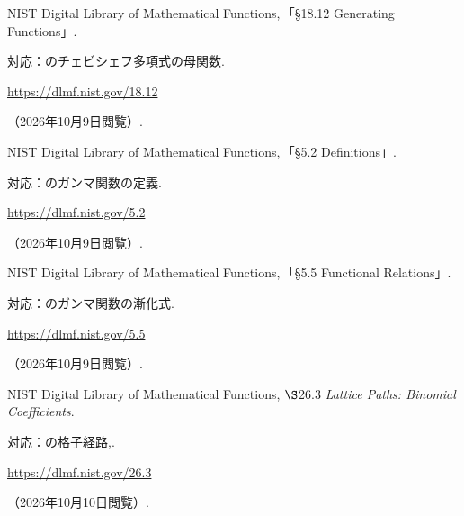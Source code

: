 \begin{enumerate}[resume,label={[\arabic*]}]
    \item \begin{minipage}[t]{\linewidth}\raggedright
        NIST Digital Library of Mathematical Functions,\,「§18.12 Generating Functions」.
        \par{\small 対応：のチェビシェフ多項式の母関数.\par}
        \par\noindent\url{https://dlmf.nist.gov/18.12}\par
        \noindent（2026年10月9日閲覧）.
      \end{minipage}\par\smallskip

    \item \begin{minipage}[t]{\linewidth}\raggedright
        NIST Digital Library of Mathematical Functions,\,「§5.2 Definitions」.
        \par{\small 対応：のガンマ関数の定義.\par}
        \par\noindent\url{https://dlmf.nist.gov/5.2}\par
        \noindent（2026年10月9日閲覧）.
      \end{minipage}\par\smallskip

    \item \begin{minipage}[t]{\linewidth}\raggedright
        NIST Digital Library of Mathematical Functions,\,「§5.5 Functional Relations」.
        \par{\small 対応：のガンマ関数の漸化式.\par}
        \par\noindent\url{https://dlmf.nist.gov/5.5}\par
        \noindent（2026年10月9日閲覧）.
      \end{minipage}\par\smallskip

    \item \begin{minipage}[t]{\linewidth}\raggedright
        NIST Digital Library of Mathematical Functions,
        $\S$26.3 \textit{Lattice Paths: Binomial Coefficients}.
        \par{\small 対応：の格子経路,.\par}
        \par\noindent\url{https://dlmf.nist.gov/26.3}\par
        \noindent（2026年10月10日閲覧）.
      \end{minipage}\par\smallskip

  \end{enumerate}

